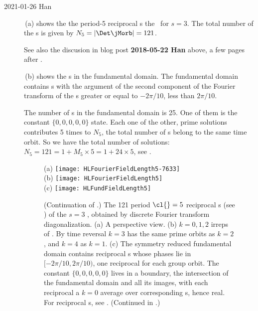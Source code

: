 \begin{description}
    \item[2021-01-26 Han]
\,(a) shows the
the period-5 reciprocal {\lattstate}s the \templatt\
for $s=3$. The total number of the {\lattstate}s is given by
$N_5=|\Det\jMorb| = 121$.

See also the discusion in blog post {\bf 2018-05-22 Han} above, a few
pages after \refeq{HLHalfAStep1}.

\,(b) shows the {\lattstate}s in the
fundamental domain. The fundamental domain contains {\lattstate}s with
the argument of the second component of the Fourier transform of the
{\lattstate}s greater or equal to $-2\pi/10$, less than $2\pi/10$.

The number of {\lattstate}s in the fundamental domain is 25. One of
them is the constant $\{0,0,0,0,0\}$ state. Each one of the other, prime
solutions contributes 5 times to $N_5$, the total number of {\lattstate}s
belong to the same time orbit. So we have the total number of solutions:
$N_5=121=1+M_5\times5 = 1+24\times5$, see  \reftab{tab:catMapN_n-s=3}.

\begin{figure}
  \centering
{(a)}$\!\!\!\!$
\texttt{[image: HLFourierFieldLength5-7633]}
\\
{(b)} %
\texttt{[image: HLFourierFieldLength5]}
~~~
\\
{(c)} %
\texttt{[image: HLFundFieldLength5]}
\\ %

  \caption{\label{fig:HLFundFieldLength5}
(Continuation of .)
The 121 period $\cl{}=5$ reciprocal {\lattstate}s (see
)  of the $s=3$ \templatt, obtained by discrete
\Cn{5} Fourier transform diagonalization.
    (a)
A perspective view.
    (b)
$k=0,1,2$ irreps of . By time reversal $k=3$ has the same prime
orbits as $k=2$, and  $k=4$ as $k=1$.
    (c)
The   symmetry reduced fundamental domain contains reciprocal
{\lattstate}s whose phases lie in $[-2\pi/10,2\pi/10)$, one reciprocal
{\lattstate} for each \Cn{5} group orbit.
The constant {\lattstate} $\{0,0,0,0,0\}$ lives in a boundary, the
intersection of the fundamental domain and all its images, with each
reciprocal {\lattstate}
a $k=0$ average over corresponding {\lattstate}s, hence real.
For  reciprocal {\lattstate}s, see
.
(Continued in .)
          }
\end{figure}


\end{description}
